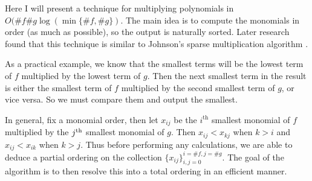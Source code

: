 Here I will present a technique for multiplying polynomials in $O(\# f \# g \log (\min\{\# f, \# g\})$. The main idea is to compute the monomials in order (as much as possible), so the output is naturally sorted. Later research found that this technique is similar to Johnson's sparse multiplication algorithm \cite{johnson-sparse-polynomial}.

As a practical example, we know that the smallest terms will be the lowest term of $f$ multiplied by the lowest term of $g$. Then the next smallest term in the result is either the smallest term of $f$ multiplied by the second smallest term of $g$, or vice versa. So we must compare them and output the smallest.

In general, fix a monomial order, then let $x_{ij}$ be the $i^{\text{th}}$ smallest monomial of $f$ multiplied by the $j^{\textrm{th}}$ smallest monomial of $g$. Then $x_{ij} < x_{kj}$ when $k > i$ and $x_{ij} < x_{ik}$ when $k > j$. Thus before performing any calculations, we are able to deduce a partial ordering on the collection $\{x_{ij}\}_{i, j=0}^{i=\# f, j = \#g}$. The goal of the algorithm is to then resolve this into a total ordering in an efficient manner.

\begin{figure}
    \center
\end{figure}

